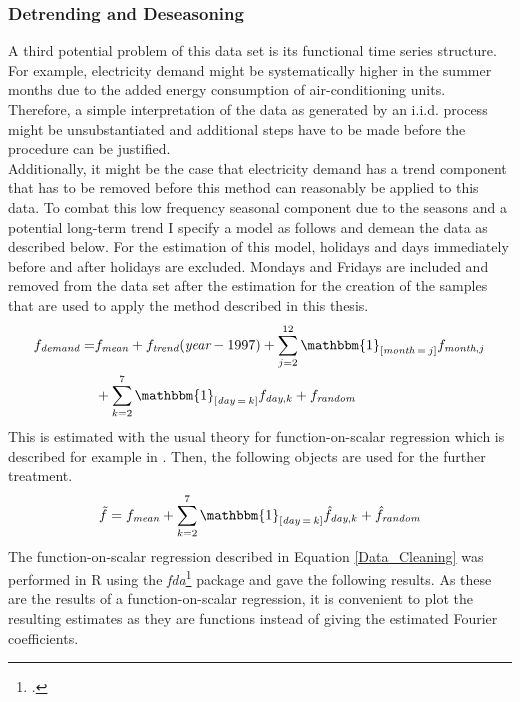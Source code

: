 \documentclass[12pt, a4paper]{article}
\theoremstyle{MAstyle} \newtheorem{assumption}{Assumption}[section]
\theoremstyle{MAstyle} \newtheorem{definition}{Definition}[section]
\theoremstyle{MAstyle} \newtheorem{theorem}{Theorem}[section]
\begin{document}
			\subsubsection{Detrending and Deseasoning}
			A third potential problem of this data set is its functional time series structure. For example, electricity demand might be systematically higher in the summer months due to the added energy consumption of air-conditioning units. Therefore, a simple interpretation of the data as generated by an i.i.d. process might be unsubstantiated and additional steps have to be made before the procedure can be justified. \\
			Additionally, it might be the case that electricity demand has a trend component that has to be removed before this method can reasonably be applied to this data. To combat this low frequency seasonal component due to the seasons and a potential long-term trend I specify a model as follows and demean the data as described below. For the estimation of this model, holidays and days immediately before and after holidays are excluded. Mondays and Fridays are included and removed from the data set after the estimation for the creation of the samples that are used to apply the method described in this thesis.
			\begin{equation}\label{Data_Cleaning}
				\begin{split}
					f_{\textit{demand}} = &f_{\textit{mean}} + f_{\textit{trend}}(\textit{year} - 1997) + \sum_{j = 2}^{12}\mathbbm{1}_{\left[\textit{month}\: = \: j\right]}f_{\textit{month}, j}\\
					 &+ \sum_{k = 2}^{7}\mathbbm{1}_{\left[\textit{day}\: = \: k\right]}f_{\textit{day}, k} + f_{\textit{random}}
				\end{split}	
			\end{equation}
			This is estimated with the usual theory for function-on-scalar regression which is described for example in \cite{ramsay_functional_2005}. Then, the following objects are used for the further treatment.
			\begin{equation}
				\tilde{f} = f_{\textit{mean}} + \sum_{k = 2}^{7}\mathbbm{1}_{\left[\textit{day}\: = \: k\right]}\hat{f}_{\textit{day}, k} + \hat{f}_{\textit{random}}
			\end{equation}
			The function-on-scalar regression described in Equation \ref{Data_Cleaning} was performed in R using the \textit{fda}\footcite{fda} package and gave the following results. As these are the results of a function-on-scalar regression, it is convenient to plot the resulting estimates as they are functions instead of giving the estimated Fourier coefficients.
			
\end{document}
